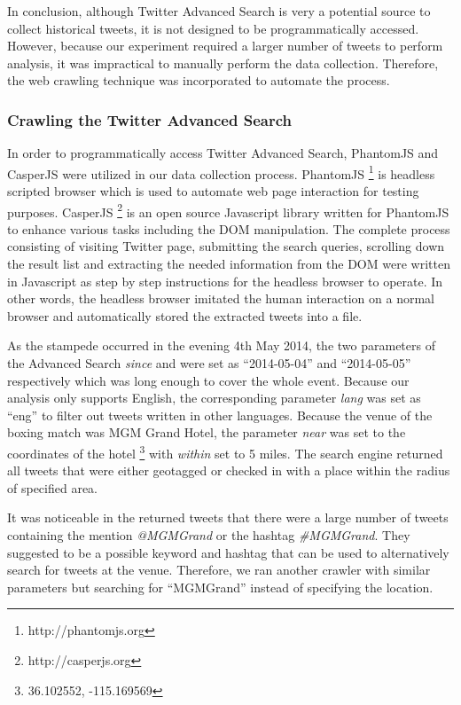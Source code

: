 In conclusion, although Twitter Advanced Search is very a potential source to collect historical tweets, it is not designed to be programmatically accessed. However, because our experiment required a larger number of tweets to perform analysis, it was impractical to manually perform the data collection. Therefore, the web crawling technique was incorporated to automate the process.

\subsubsection{Crawling the Twitter Advanced Search}
In order to programmatically access Twitter Advanced Search, PhantomJS and CasperJS were utilized in our data collection process. PhantomJS \footnote{http://phantomjs.org} is headless scripted browser which is used to automate web page interaction for testing purposes. CasperJS \footnote{http://casperjs.org} is an open source Javascript library written for PhantomJS to enhance various tasks including the DOM manipulation. The complete process consisting of visiting Twitter page, submitting the search queries, scrolling down the result list and extracting the needed information from the DOM were written in Javascript as step by step instructions for the headless browser to operate. In other words, the headless browser imitated the human interaction on a normal browser and automatically stored the extracted tweets into a file.

As the stampede occurred in the evening 4th May 2014, the two parameters of the Advanced Search \textit{since} and  were set as ``2014-05-04'' and ``2014-05-05'' respectively which was long enough to cover the whole event. Because our analysis only supports English, the corresponding parameter \textit{lang} was set as ``eng'' to filter out tweets written in other languages. Because the venue of the boxing match was MGM Grand Hotel, the parameter \textit{near} was set to the coordinates of the hotel \footnote{36.102552, -115.169569} with \textit{within} set to 5 miles. The search engine returned all tweets that were either geotagged or checked in with a place within the radius of specified area.

It was noticeable in the returned tweets that there were a large number of tweets containing the mention \textit{@MGMGrand} or the hashtag \textit{#MGMGrand}. They suggested to be a possible keyword and hashtag that can be used to alternatively search for tweets at the venue. Therefore, we ran another crawler with similar parameters but searching for ``MGMGrand'' instead of specifying the location.

